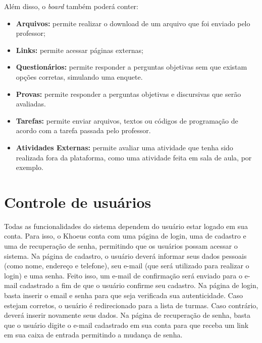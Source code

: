 Além disso, o \textit{board} também poderá conter:

\begin{itemize}
	\item \textbf{Arquivos:} permite realizar o download de um arquivo que foi enviado pelo professor;
	\item \textbf{Links:} permite acessar páginas externas;
	\item \textbf{Questionários:} permite responder a perguntas objetivas sem que existam opções corretas, simulando uma enquete.
	\item \textbf{Provas:} permite responder a perguntas objetivas e discursivas que serão avaliadas.
	\item \textbf{Tarefas:}  permite enviar arquivos, textos ou códigos de programação de acordo com a tarefa passada pelo professor.
	\item \textbf{Atividades Externas:}  permite avaliar uma atividade que tenha sido realizada fora da plataforma, como uma atividade feita em sala de aula, por exemplo.
\end{itemize}


\section{Controle de usuários}
\label{sec-minimundo:controle-usuarios}

Todas as funcionalidades do sistema dependem do usuário estar logado em sua conta. Para isso, o Khoeus conta com uma página de login, uma de cadastro e uma de recuperação de senha, permitindo que os usuários possam acessar o sistema. Na página de cadastro, o usuário deverá informar seus dados pessoais (como nome, endereço e telefone), seu e-mail (que será utilizado para realizar o login) e uma senha. Feito isso, um e-mail de confirmação será enviado para o e-mail cadastrado a fim de que o usuário confirme seu cadastro. Na página de login, basta inserir o email e senha para que seja verificada sua autenticidade. Caso estejam corretos, o usuário é redirecionado para a lista de turmas. Caso contrário, deverá inserir novamente seus dados. Na página de recuperação de senha, basta que o usuário digite o e-mail cadastrado em sua conta para que receba um link em sua caixa de entrada permitindo a mudança de senha. 

